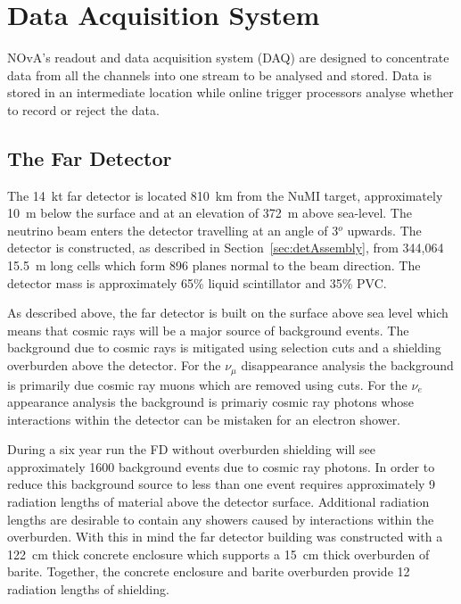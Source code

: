\section{Data Acquisition System}

NOvA's readout and data acquisition system (DAQ) are designed to
concentrate data from all the channels into one stream to be analysed
and stored.
Data is stored in an intermediate location while online trigger
processors analyse whether to record or reject the data.








\subsection{The Far Detector}\label{sec:fardet}

The 14~kt far detector is located 810~km from the NuMI target,
approximately 10~m below the surface and at an elevation of 372~m
above sea-level. The neutrino beam enters the
detector travelling at an angle of 3$^o$ upwards. The detector is
constructed, as described in Section~\ref{sec:detAssembly}, from
344,064 15.5~m long cells which form 896 planes normal to the beam
direction. The detector mass is approximately 65\% liquid scintillator
and 35\% PVC.

As described above, the far detector is built on the surface above sea
level which means that cosmic rays will be a major source of
background events. The background due to cosmic rays is mitigated
using selection cuts and a shielding overburden above the detector.
For the $\nu_{\mu}$ disappearance analysis the background is primarily
due cosmic ray muons which are removed using cuts. For the $\nu_e$
appearance analysis the background is primariy cosmic ray photons
whose interactions within the detector can be mistaken for an electron
shower. 

During a six year run the FD without overburden shielding will see
approximately 1600 background events due to cosmic ray photons. In
order to reduce this background source to less than one event requires
approximately 9 radiation lengths of material above the detector
surface. Additional radiation lengths are desirable to contain any
showers caused by interactions within the overburden. With this in
mind the far detector building was constructed with a 122~cm thick
concrete enclosure which supports a 15~cm thick overburden of
barite. Together, the concrete enclosure and barite overburden provide
12 radiation lengths of shielding.



